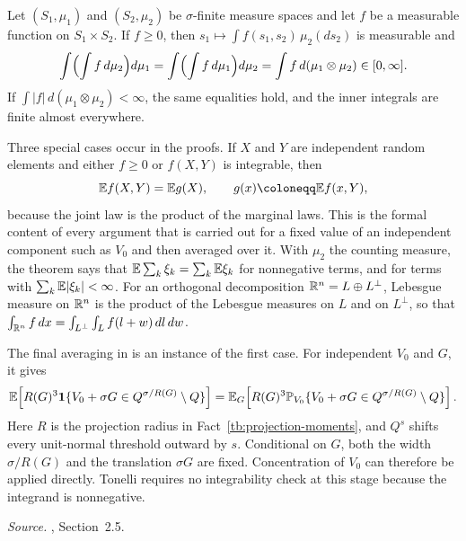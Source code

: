 \begin{fact}\label{tb:fubini}
Let \((S_1,\mu_1)\) and \((S_2,\mu_2)\) be \(\sigma\)-finite measure
spaces and let \(f\) be a measurable function on \(S_1\times S_2\). If
\(f\ge0\), then \(s_1\mapsto\int f(s_1,s_2)\,\mu_2(ds_2)\) is measurable
and
\[
 \int\Bigl(\int f\,d\mu_2\Bigr)d\mu_1
 =\int\Bigl(\int f\,d\mu_1\Bigr)d\mu_2
 =\int f\,d(\mu_1\otimes\mu_2)\in[0,\infty].
\]
If \(\int|f|\,d(\mu_1\otimes\mu_2)<\infty\), the same equalities hold, and
the inner integrals are finite almost everywhere.
\end{fact}

Three special cases occur in the proofs. If \(X\) and \(Y\) are
independent random elements and either \(f\ge0\) or \(f(X,Y)\) is
integrable, then
\[
 \E f(X,Y)=\E g(X),\qquad g(x)\coloneqq \E f(x,Y),
\]
because the joint law is the product of the marginal laws. This is the
formal content of every argument that is carried out for a fixed value of
an independent component such as \(V_0\) and then averaged over it. With
\(\mu_2\) the counting measure, the theorem says that
\(\mathbb E\sum_k\xi_k=\sum_k\mathbb E\xi_k\) for nonnegative terms, and for terms with
\(\sum_k\mathbb E|\xi_k|<\infty\). For an orthogonal decomposition
\(\mathbb R^n=L\oplus L^\perp\), Lebesgue measure on \(\mathbb R^n\) is the product of the
Lebesgue measures on \(L\) and on \(L^\perp\), so that
\(\int_{\mathbb R^n}f\,dx=\int_{L^\perp}\int_Lf(l+w)\,dl\,dw\).

The final averaging in  is an
instance of the first case. For independent \(V_0\) and \(G\), it gives
\[
 \mathbb E\!\left[R(G)^3\mathbf 1\{V_0+\sigma G\in
                   Q^{\sigma/R(G)}\setminus Q\}\right]
 =\mathbb E_G\!\left[R(G)^3\mathbb P_{V_0}\{V_0+\sigma G\in
                   Q^{\sigma/R(G)}\setminus Q\}\right].
\]
Here \(R\) is the projection radius in
Fact~\ref{tb:projection-moments}, and \(Q^s\) shifts every
unit-normal threshold outward by \(s\). Conditional on \(G\), both
the width \(\sigma/R(G)\) and the translation \(\sigma G\) are fixed.
Concentration of \(V_0\) can therefore be applied directly. Tonelli
requires no integrability check at this stage because the integrand
is nonnegative.

\emph{Source.} , Section~2.5.

